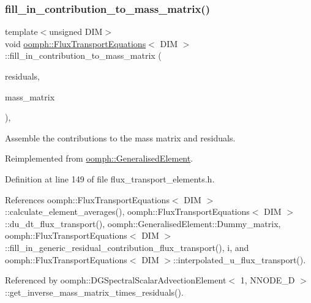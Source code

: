 \subsubsection{\texorpdfstring{fill\+\_\+in\+\_\+contribution\+\_\+to\+\_\+mass\+\_\+matrix()}{fill\_in\_contribution\_to\_mass\_matrix()}}
{\footnotesize\ttfamily template$<$unsigned D\+IM$>$ \\
void \hyperlink{classoomph_1_1FluxTransportEquations}{oomph\+::\+Flux\+Transport\+Equations}$<$ D\+IM $>$\+::fill\+\_\+in\+\_\+contribution\+\_\+to\+\_\+mass\+\_\+matrix (\begin{DoxyParamCaption}\item[{\hyperlink{classoomph_1_1Vector}{Vector}$<$ double $>$ \&}]{residuals,  }\item[{\hyperlink{classoomph_1_1DenseMatrix}{Dense\+Matrix}$<$ double $>$ \&}]{mass\+\_\+matrix }\end{DoxyParamCaption})\hspace{0.3cm}{\ttfamily [inline]}, {\ttfamily [virtual]}}



Assemble the contributions to the mass matrix and residuals. 



Reimplemented from \hyperlink{classoomph_1_1GeneralisedElement_a09e337880e9bfc6e2d43202616121b50}{oomph\+::\+Generalised\+Element}.



Definition at line 149 of file flux\+\_\+transport\+\_\+elements.\+h.



References oomph\+::\+Flux\+Transport\+Equations$<$ D\+I\+M $>$\+::calculate\+\_\+element\+\_\+averages(), oomph\+::\+Flux\+Transport\+Equations$<$ D\+I\+M $>$\+::du\+\_\+dt\+\_\+flux\+\_\+transport(), oomph\+::\+Generalised\+Element\+::\+Dummy\+\_\+matrix, oomph\+::\+Flux\+Transport\+Equations$<$ D\+I\+M $>$\+::fill\+\_\+in\+\_\+generic\+\_\+residual\+\_\+contribution\+\_\+flux\+\_\+transport(), i, and oomph\+::\+Flux\+Transport\+Equations$<$ D\+I\+M $>$\+::interpolated\+\_\+u\+\_\+flux\+\_\+transport().



Referenced by oomph\+::\+D\+G\+Spectral\+Scalar\+Advection\+Element$<$ 1, N\+N\+O\+D\+E\+\_\+D $>$\+::get\+\_\+inverse\+\_\+mass\+\_\+matrix\+\_\+times\+\_\+residuals().

\mbox{\label{classoomph_1_1FluxTransportEquations_aba11971044cd76f543105d8d5bfcd163}} 
